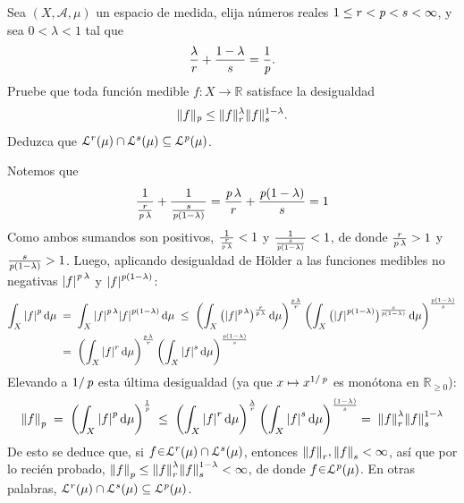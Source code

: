 \setcounter{neje}{43}
\begin{nejer}
Sea $(X, \mathcal{A}, \mu)$ un espacio de medida, elija números reales $1 \le r < {\operatorname{\textit{p}}} < s < \infty$, y sea $0 < \lambda < 1$ tal que
$$
\frac{\lambda}{r} + \frac{1 - \lambda}{s} = \frac{1}{{\operatorname{\textit{p}}}}.
$$
Pruebe que toda función medible $f \colon X \to \mathbb{R}$ satisface la desigualdad
$$
\|f\|_{\operatorname{\textit{p}}} \le \|f\|_r^\lambda \|f\|_s^{1-\lambda}.
$$
Deduzca que $\mathcal{L}^r(\mu) \cap \mathcal{L}^s(\mu) \subseteq \mathcal{L}^{\operatorname{\textit{p}}}(\mu)$.
\end{nejer}
\begin{sol}
Notemos que
\[
\frac{1}{\frac{r}{\operatorname{\textit{p}}\lambda}} + \frac{1}{\frac{s}{\operatorname{\textit{p}}(1-\lambda)}} = \frac{\operatorname{\textit{p}}\lambda}{r} + \frac{\operatorname{\textit{p}}(1-\lambda)}{s} = 1
\]
Como ambos sumandos son positivos, $\frac{1}{\frac{r}{\operatorname{\textit{p}}\lambda}} < 1$ y $\frac{1}{\frac{s}{\operatorname{\textit{p}}(1-\lambda)}} < 1$, de donde $\frac{r}{\operatorname{\textit{p}}\lambda} > 1$ y $\frac{s}{\operatorname{\textit{p}}(1-\lambda)} > 1$. Luego, aplicando desigualdad de Hölder a las funciones medibles no negativas $\abs{f}^{\operatorname{\textit{p}}\lambda}$ y $\abs{f}^{\operatorname{\textit{p}}(1-\lambda)}$:
\begin{align*}
\int_X \abs{f}^{\operatorname{\textit{p}}} \dd{\mu}
&\;=\; \int_X \abs{f}^{\operatorname{\textit{p}}\lambda}\abs{f}^{\operatorname{\textit{p}}(1-\lambda)} \dd{\mu}
\;\leq\; \left( 
        \int_X \big(\abs{f}^{\operatorname{\textit{p}}\lambda}\big)^{\frac{r}{\operatorname{\textit{p}}\lambda}} \dd{\mu} 
    \right)^{\frac{\operatorname{\textit{p}}\lambda}{r}} \left(  
        \int_X \big(\abs{f}^{\operatorname{\textit{p}}(1-\lambda)}\big)^{\frac{s}{\operatorname{\textit{p}}(1-\lambda)}} \dd{\mu}
    \right)^{\frac{\operatorname{\textit{p}}(1-\lambda)}{s}}\\
&\;=\; \left( 
        \int_X \abs{f}^{r} \dd{\mu} 
    \right)^{\frac{\operatorname{\textit{p}}\lambda}{r}} \left(  
        \int_X \abs{f}^{s} \dd{\mu}
    \right)^{\frac{\operatorname{\textit{p}}(1-\lambda)}{s}}
\end{align*}
Elevando a $1/\operatorname{\textit{p}}$ esta última desigualdad (ya que $x \mapsto x^{1/\operatorname{\textit{p}}}$ es monótona en $\mathbb{R}_{\ge0}$):
\[
\norm{f}_{\operatorname{\textit{p}}} 
\;=\; \left(\int_X \abs{f}^{\operatorname{\textit{p}}} \dd{\mu}\right)^{\frac{1}{\operatorname{\textit{p}}}} 
\;\leq\; \left( 
        \int_X \abs{f}^{r} \dd{\mu} 
    \right)^{\frac{\lambda}{r}} \left(  
        \int_X \abs{f}^{s} \dd{\mu}
    \right)^{\frac{(1-\lambda)}{s}}\!\!
\;=\; \norm{f}^\lambda_r \norm{f}^{1-\lambda}_s
\]
De esto se deduce que, si $f\en \mathcal{L}^r(\mu) \cap \mathcal{L}^s(\mu)$, entonces $\norm{f}_r,\norm{f}_s < \infty$, así que por lo recién probado, $\norm{f}_{\operatorname{\textit{p}}} \leq \norm{f}^\lambda_r \norm{f}^{1-\lambda}_s < \infty$, de donde $f\en\mathcal{L}^{\p}(\mu)$. En otras palabras, $\mathcal{L}^r(\mu) \cap \mathcal{L}^s(\mu) \subseteq \mathcal{L}^{\operatorname{\textit{p}}}(\mu)$.
\end{sol}